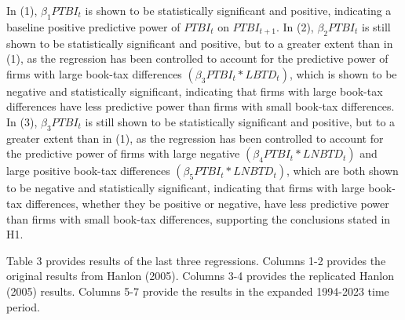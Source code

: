 \documentclass[12pt]{article}
\begin{document}
In (1), $\beta_1PTBI_t$ is shown to be statistically significant and positive, indicating a baseline positive predictive power of $PTBI_t$ on $PTBI_{t+1}$. In (2), $\beta_2PTBI_t$ is still shown to be statistically significant and positive, but to a greater extent than in (1), as the regression has been controlled to account for the predictive power of firms with large book-tax differences $(\beta_3PTBI_t * LBTD_t)$, which is shown to be negative and statistically significant, indicating that firms with large book-tax differences have less predictive power than firms with small book-tax differences. In (3), $\beta_3PTBI_t$ is still shown to be statistically significant and positive, but to a greater extent than in (1), as the regression has been controlled to account for the predictive power of firms with large negative $(\beta_4PTBI_t * LNBTD_t)$ and large positive book-tax differences $(\beta_5PTBI_t * LNBTD_t)$, which are both shown to be negative and statistically significant, indicating that firms with large book-tax differences, whether they be positive or negative, have less predictive power than firms with small book-tax differences, supporting the conclusions stated in H1.

Table 3 provides results of the last three regressions. Columns 1-2 provides the original results from Hanlon (2005). Columns 3-4 provides the replicated Hanlon (2005) results. Columns 5-7 provide the results in the expanded 1994-2023 time period. 
\end{document}
